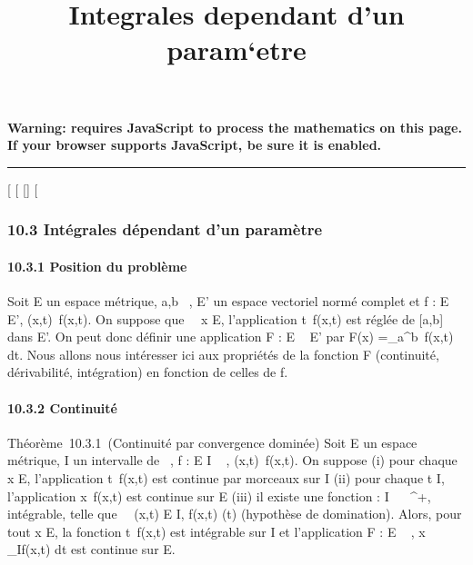 \documentclass[]{article}
\title{Integrales dependant d'un param`etre}
\author{}
\date{}
\begin{document}
\maketitle

\textbf{Warning: 
requires JavaScript to process the mathematics on this page.\\ If your
browser supports JavaScript, be sure it is enabled.}

\begin{center}\rule{3in}{0.4pt}\end{center}

[
[
[]
[

\subsubsection{10.3 Intégrales dépendant d'un paramètre}

\paragraph{10.3.1 Position du problème}

Soit E un espace métrique, a,b \in {}~, E' un espace vectoriel normé complet
et f : E \times [a,b] \rightarrow~ E', (x,t)\mapsto~f(x,t). On
suppose que \forall~~x \in E, l'application
t\mapsto~f(x,t) est réglée de [a,b] dans E'. On
peut donc définir une application F : E \rightarrow~ E' par F(x)
=\int  _a^b~f(x,t) dt. Nous allons
nous intéresser ici aux propriétés de la fonction F (continuité,
dérivabilité, intégration) en fonction de celles de f.

\paragraph{10.3.2 Continuité}

Théorème~10.3.1~(Continuité par convergence dominée) Soit E un espace
métrique, I un intervalle de ~, f : E \times I \rightarrow~ ,
(x,t)\mapsto~f(x,t). On suppose (i) pour chaque x \in
E, l'application t\mapsto~f(x,t) est continue par
morceaux sur I (ii) pour chaque t \in I, l'application
x\mapsto~f(x,t) est continue sur E (iii) il existe
une fonction \phi : I \rightarrow~ ~^+, intégrable, telle que
\forall~~(x,t) \in E \times I, f(x,t)\leq
\phi(t) (hypothèse de domination). Alors, pour tout x \in E, la fonction
t\mapsto~f(x,t) est intégrable sur I et
l'application F : E \rightarrow~ ,
x\mapsto~\int ~
_If(x,t) dt est continue sur E.
\end{document}
